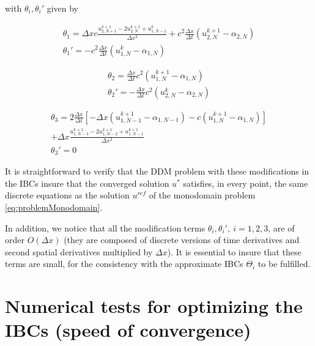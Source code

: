 \noindent with $\theta_i, \theta_i'$ given by

\begin{gather*}
    \theta_1 = \Delta x c \frac{u_{2,N+1}^{k+1} - 2u_{2,N}^{k+1} + u_{1,N-1}^{k}}{\Delta x^2} + c^2\frac{\Delta x}{\Delta t} \left( u_{2,N}^{k+1} - \alpha_{2,N} \right)\\
    \theta_1' = - c^2\frac{\Delta x}{\Delta t} \left( u_{1,N}^{k} - \alpha_{1,N} \right)
\end{gather*}

\begin{equation*}
\begin{gathered}
    \theta_2 = \frac{\Delta x}{\Delta t} c^2 \left(u_{1,N}^{k+1} - \alpha_{1,N}\right) \\
    \theta_2' = -\frac{\Delta x}{\Delta t} c^2 \left(u_{2,N}^{k} - \alpha_{2,N}\right)
\end{gathered}
\end{equation*}

\begin{equation*}
\begin{gathered}
    \theta_3  = 2\frac{\Delta x}{\Delta t} \left[-\Delta x \left(u_{1,N-1}^{k+1} - \alpha_{1,N-1} \right) - c \left(u_{1,N}^{k+1} - \alpha_{1,N}  \right) \right] \\  + \Delta x \frac{u_{1,N-3}^{k+1} - 2u_{1,N-2}^{k+1} + u_{1,N-1}^{k+1}}{\Delta x^2} \\
    \theta_3' = 0
\end{gathered}
\end{equation*}

\indent It is straightforward to verify that the DDM problem with these modifications in the IBCs insure that the converged solution $u^*$ satisfies, in every point, the same discrete equations as the solution $u^{ref}$ of the monodomain problem \eqref{eq:problemMonodomain}.

\indent In addition, we notice that all the modification terms $\theta_i,\theta_i', \ i = 1,2,3$, are of order $O(\Delta x)$ (they are composed of discrete versions of time derivatives and second spatial derivatives multiplied by $\Delta x$). It is essential to insure that these terms are small, for the consistency with the approximate IBCs $\Theta_i$ to be fulfilled.

\section{Numerical tests for optimizing the IBCs (speed of convergence)}
\label{sec:optim}

